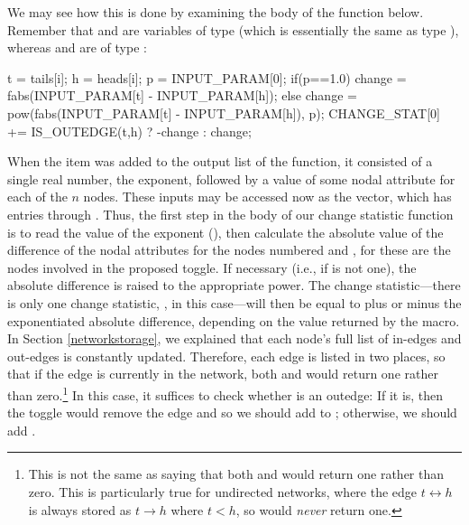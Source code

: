 \documentclass[nojss]{jss}
\begin{document}
We may see how this is done by examining the body of the  function below.
Remember that  and  are variables of type  (which is essentially
the same as type ), whereas  and  are of type
:
\begin{CodeChunk}
\begin{CodeInput}
    t = tails[i]; h = heads[i];
    p = INPUT_PARAM[0];
    if(p==1.0){
      change = fabs(INPUT_PARAM[t] - INPUT_PARAM[h]);
    }else{
      change = pow(fabs(INPUT_PARAM[t] - INPUT_PARAM[h]), p);
    }
    CHANGE_STAT[0] += IS_OUTEDGE(t,h) ? -change : change;
\end{CodeInput}
\end{CodeChunk}
When the  item was added to the output list of the
 function, it consisted of a single
real number, the exponent, followed by a value of some nodal attribute
for each of the $n$ nodes.  These inputs may be accessed now as the
 vector, which has entries
 through .
Thus, the first step in the body of our change statistic function is to read the value of
the exponent (), then calculate the absolute value of the
difference of the nodal attributes for the nodes numbered  and ,
for these are the nodes involved in the proposed toggle.  If necessary (i.e.,
if  is not one),
the absolute difference is raised to the appropriate power.
The change statistic---there is only one change statistic,
, in this case---will then be equal to plus or minus
the exponentiated absolute difference, depending on the value
returned by the  macro.  In Section \ref{networkstorage},
we explained that each node's full list of in-edges and out-edges is constantly
updated.  Therefore, each edge is listed in two places, so that if the
edge  is currently in the network, both
 and  would return one
rather than zero.\footnote{This is not the same as saying that
both  and  would return one rather than zero.  This is particularly true for undirected networks, where the edge
$t\!\longleftrightarrow\!h$ is always stored as
$t\!\longrightarrow\!h$ where $t<h$, so
 would {\em never} return one.}
In this case, it suffices to check whether  is
an outedge:  If it is, then the toggle would remove the edge and so
we should add  to ; otherwise,
we should add .
\end{document}
